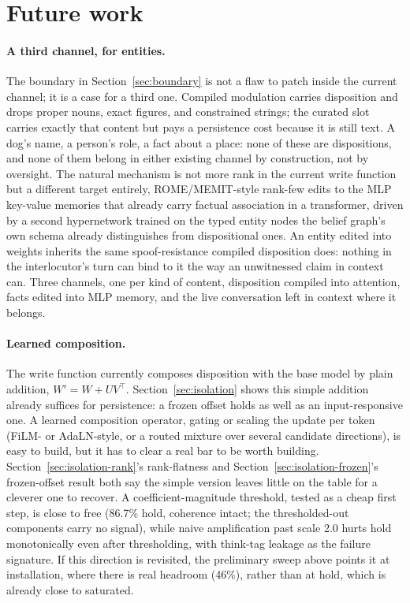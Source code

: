 \iflongversion
\section{Future work}
\label{sec:futurework}

\paragraph{A third channel, for entities.} The boundary in Section~\ref{sec:boundary}
is not a flaw to patch inside the current channel; it is a case for a third one. Compiled
modulation carries disposition and drops proper nouns, exact figures, and constrained
strings; the curated slot carries exactly that content but pays a persistence cost
because it is still text. A dog's name, a person's role, a fact about a place: none of
these are dispositions, and none of them belong in either existing channel by
construction, not by oversight. The natural mechanism is not more rank in the current
write function but a different target entirely, ROME/MEMIT-style rank-few edits to the
MLP key-value memories that already carry factual association in a transformer, driven
by a second hypernetwork trained on the typed entity nodes the belief graph's own schema
already distinguishes from dispositional ones. An entity edited into weights inherits
the same spoof-resistance compiled disposition does: nothing in the interlocutor's turn
can bind to it the way an unwitnessed claim in context can. Three channels, one per kind
of content, disposition compiled into attention, facts edited into MLP memory, and the
live conversation left in context where it belongs.

\paragraph{Learned composition.} The write function currently composes disposition with
the base model by plain addition, \(W' = W + U V^\top\). Section~\ref{sec:isolation}
shows this simple addition already suffices for persistence: a frozen offset holds as
well as an input-responsive one. A learned composition operator, gating or scaling the
update per token (FiLM- or AdaLN-style, or a routed mixture over several candidate
directions), is easy to build, but it has to clear a real bar to be worth building.
Section~\ref{sec:isolation-rank}'s rank-flatness and Section~\ref{sec:isolation-frozen}'s
frozen-offset result both say the simple version leaves little on the table for a
cleverer one to recover. A coefficient-magnitude threshold, tested as a cheap first
step, is close to free (86.7\% hold, coherence intact; the thresholded-out components
carry no signal), while naive amplification past scale 2.0 hurts hold monotonically even
after thresholding, with think-tag leakage as the failure signature. If this direction
is revisited, the preliminary sweep above points it at installation, where there is real
headroom (46\%), rather than at hold, which is already close to saturated.

